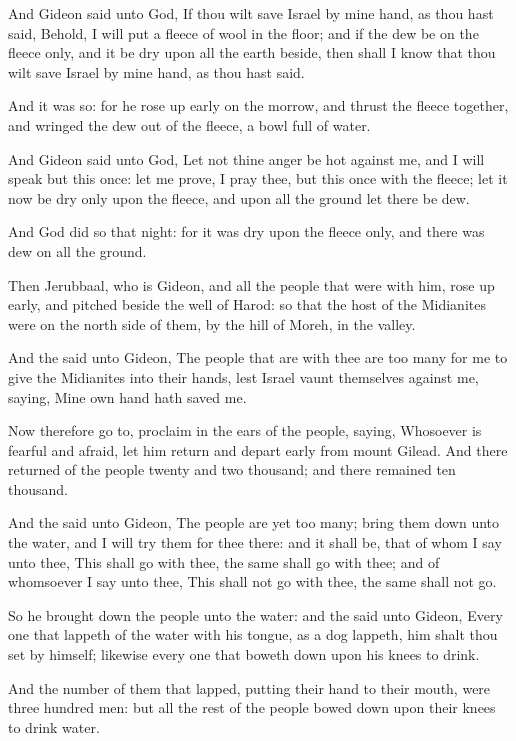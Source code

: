 \Verse And Gideon said unto God, If thou wilt save Israel by mine hand, as thou hast said, \Verse Behold, I will put a fleece of wool in the floor; and if the dew be on the fleece only, and it be dry upon all the earth beside, then shall I know that thou wilt save Israel by mine hand, as thou hast said.

\Verse And it was so: for he rose up early on the morrow, and thrust the fleece together, and wringed the dew out of the fleece, a bowl full of water.

\Verse And Gideon said unto God, Let not thine anger be hot against me, and I will speak but this once: let me prove, I pray thee, but this once with the fleece; let it now be dry only upon the fleece, and upon all the ground let there be dew.

\Verse And God did so that night: for it was dry upon the fleece only, and there was dew on all the ground.


\Chapter
\Verse Then Jerubbaal, who is Gideon, and all the people that were with him, rose up early, and pitched beside the well of Harod: so that the host of the Midianites were on the north side of them, by the hill of Moreh, in the valley.

\Verse And the \LORD said unto Gideon, The people that are with thee are too many for me to give the Midianites into their hands, lest Israel vaunt themselves against me, saying, Mine own hand hath saved me.

\Verse Now therefore go to, proclaim in the ears of the people, saying, Whosoever is fearful and afraid, let him return and depart early from mount Gilead. And there returned of the people twenty and two thousand; and there remained ten thousand.

\Verse And the \LORD said unto Gideon, The people are yet too many; bring them down unto the water, and I will try them for thee there: and it shall be, that of whom I say unto thee, This shall go with thee, the same shall go with thee; and of whomsoever I say unto thee, This shall not go with thee, the same shall not go.

\Verse So he brought down the people unto the water: and the \LORD said unto Gideon, Every one that lappeth of the water with his tongue, as a dog lappeth, him shalt thou set by himself; likewise every one that boweth down upon his knees to drink.

\Verse And the number of them that lapped, putting their hand to their mouth, were three hundred men: but all the rest of the people bowed down upon their knees to drink water.

